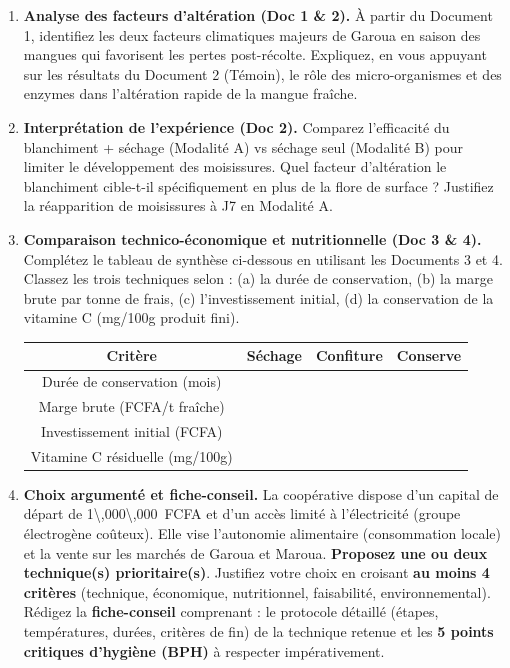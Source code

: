 \documentclass[11pt]{article}
\newcounter{popsec}
\newcounter{popsub}
\newcommand{\courssub}[1]{%
  \stepcounter{popsub}%
  \par\vspace{9pt}\noindent{\popxbold\fontsize{11.5}{13}\selectfont\color{popink}{\color{poporange}\thepopsec.\thepopsub}\hspace{6pt}#1}\par\nopagebreak\vspace{4pt}
}
\begin{document}
\courssub{Consignes}
\begin{enumerate}
    \item \textbf{Analyse des facteurs d'altération (Doc 1 \& 2).} À partir du Document 1, identifiez les deux facteurs climatiques majeurs de Garoua en saison des mangues qui favorisent les pertes post-récolte. Expliquez, en vous appuyant sur les résultats du Document 2 (Témoin), le rôle des micro-organismes et des enzymes dans l'altération rapide de la mangue fraîche.
    \item \textbf{Interprétation de l'expérience (Doc 2).} Comparez l'efficacité du blanchiment + séchage (Modalité A) vs séchage seul (Modalité B) pour limiter le développement des moisissures. Quel facteur d'altération le blanchiment cible-t-il spécifiquement en plus de la flore de surface ? Justifiez la réapparition de moisissures à J7 en Modalité A.
    \item \textbf{Comparaison technico-économique et nutritionnelle (Doc 3 \& 4).} Complétez le tableau de synthèse ci-dessous en utilisant les Documents 3 et 4. Classez les trois techniques selon : (a) la durée de conservation, (b) la marge brute par tonne de frais, (c) l'investissement initial, (d) la conservation de la vitamine C (mg/100g produit fini).
    \begin{center}
    \begin{tabularx}{\linewidth}{|c|X|X|X|}\hline
    \rowcolor{popblueL}
    \textbf{Critère} & \textbf{Séchage} & \textbf{Confiture} & \textbf{Conserve} \\ \hline
    Durée de conservation (mois) & & & \\ \hline
    Marge brute (FCFA/t fraîche) & & & \\ \hline
    Investissement initial (FCFA) & & & \\ \hline
    Vitamine C résiduelle (mg/100g) & & & \\ \hline
    \end{tabularx}
    \end{center}
    \item \textbf{Choix argumenté et fiche-conseil.} La coopérative dispose d'un capital de départ de \SI{1\,000\,000}{FCFA} et d'un accès limité à l'électricité (groupe électrogène coûteux). Elle vise l'autonomie alimentaire (consommation locale) et la vente sur les marchés de Garoua et Maroua. \textbf{Proposez une ou deux technique(s) prioritaire(s)}. Justifiez votre choix en croisant \textbf{au moins 4 critères} (technique, économique, nutritionnel, faisabilité, environnemental). Rédigez la \textbf{fiche-conseil} comprenant : le protocole détaillé (étapes, températures, durées, critères de fin) de la technique retenue et les \textbf{5 points critiques d'hygiène (BPH)} à respecter impérativement.
\end{enumerate}
\end{document}
